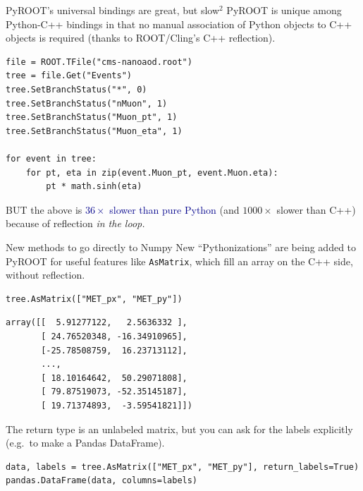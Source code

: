 \documentclass[aspectratio=169]{beamer}
\begin{document}
\begin{frame}[fragile]{PyROOT's universal bindings are great, but slow$^2$}
\vspace{0.5 cm}
PyROOT is unique among Python-C++ bindings in that no manual association of Python objects to C++ objects is required (thanks to ROOT/Cling's C++ reflection).

\vspace{0.25 cm}
\small
\begin{verbatim}
file = ROOT.TFile("cms-nanoaod.root")
tree = file.Get("Events")
tree.SetBranchStatus("*", 0)
tree.SetBranchStatus("nMuon", 1)
tree.SetBranchStatus("Muon_pt", 1)
tree.SetBranchStatus("Muon_eta", 1)

for event in tree:
    for pt, eta in zip(event.Muon_pt, event.Muon.eta):
        pt * math.sinh(eta)
\end{verbatim}
\large

\vspace{0.25 cm}
BUT the above is \textcolor{darkblue}{$36\times$ slower than pure Python} (and $1000\times$ slower than C++) because of reflection {\it in the loop.}
\end{frame}

\begin{frame}[fragile]{New methods to go directly to Numpy}
\large
\vspace{0.5 cm}
New ``Pythonizations'' are being added to PyROOT for useful features like {\tt AsMatrix}, which fill an array on the C++ side, without reflection.

\small
\begin{verbatim}
tree.AsMatrix(["MET_px", "MET_py"])
\end{verbatim}
\begin{verbatim}
array([[  5.91277122,   2.5636332 ],
       [ 24.76520348, -16.34910965],
       [-25.78508759,  16.23713112],
       ...,
       [ 18.10164642,  50.29071808],
       [ 79.87519073, -52.35145187],
       [ 19.71374893,  -3.59541821]])
\end{verbatim}
\large

\vspace{0.25 cm}
The return type is an unlabeled matrix, but you can ask for the labels explicitly (e.g.\ to make a Pandas DataFrame).

\small
\begin{verbatim}
data, labels = tree.AsMatrix(["MET_px", "MET_py"], return_labels=True)
pandas.DataFrame(data, columns=labels)
\end{verbatim}
\end{frame}
\end{document}
